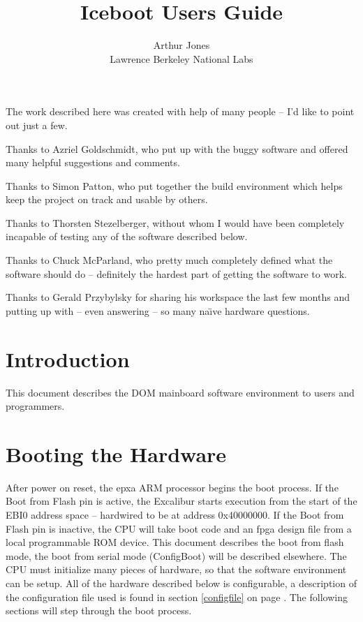 \documentclass{article}
\begin{document}
\title{Iceboot Users Guide}
\author{Arthur Jones \\ Lawrence Berkeley National Labs }
\maketitle
\thispagestyle{empty}

\eject

The work described here was created with help
of many people -- I'd like to point out just a few.

Thanks to Azriel Goldschmidt, who put up with the
buggy software and offered many helpful suggestions
and comments.

Thanks to Simon Patton, who put together the build environment
which helps keep the project on track and usable
by others.

Thanks to Thorsten Stezelberger, without whom
I would have been completely incapable of testing
any of the software described below.

Thanks to Chuck McParland, who pretty much
completely defined what the software should 
do -- definitely the hardest part of getting the
software to work.

Thanks to Gerald Przybylsky
for sharing his workspace the last few months
and putting up with -- even answering -- so 
many na\" \i ve hardware questions.

\thispagestyle{empty}

\eject

\tableofcontents

\eject

\section{Introduction}

This document describes
the DOM mainboard software environment to
users and programmers.

\section{Booting the Hardware}

After power on reset, the epxa ARM processor
begins the boot process.  If the Boot from
Flash  pin is active,
the Excalibur starts execution from the start
of the EBI0 address space -- hardwired to be
at address 0x40000000.  If the Boot from Flash
pin is inactive, the CPU will take boot code
and an fpga design file from a local programmable
ROM device.  This document describes the boot
from flash mode, the boot from serial mode (ConfigBoot) will
be described elsewhere.
The CPU must initialize
many pieces of hardware, so that the software
environment can be setup. All of the hardware described below
is configurable, a description of the configuration file used
is found in section \ref{configfile}
on page \pageref{configfile}.  The following
sections will step through the boot process.
\end{document}
